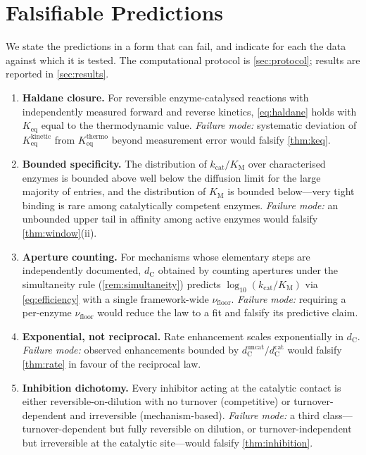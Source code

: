 \documentclass[11pt,twocolumn,a4paper]{article}
\theoremstyle{plain}
\theoremstyle{definition}
\theoremstyle{remark}
\newcommand{\dC}{d_{\mathrm{C}}}
\newcommand{\nufloor}{\nu_{\mathrm{floor}}}
\newcommand{\kcat}{k_{\mathrm{cat}}}
\newcommand{\KM}{K_{\mathrm{M}}}
\newcommand{\Keq}{K_{\mathrm{eq}}}
\begin{document}
\section{Falsifiable Predictions}
\label{sec:predictions}

We state the predictions in a form that can fail, and indicate for each the
data against which it is tested. The computational protocol is
\cref{sec:protocol}; results are reported in \cref{sec:results}.

\begin{enumerate}[label=\textbf{P\arabic*.},leftmargin=3em,itemsep=0.6em]

\item \textbf{Haldane closure.} For reversible enzyme-catalysed reactions with
independently measured forward and reverse kinetics, \cref{eq:haldane} holds
with $\Keq$ equal to the thermodynamic value. \emph{Failure mode:} systematic
deviation of $\Keq^{\text{kinetic}}$ from $\Keq^{\text{thermo}}$ beyond
measurement error would falsify \cref{thm:keq}.

\item \textbf{Bounded specificity.} The distribution of $\kcat/\KM$ over
characterised enzymes is bounded above well below the diffusion limit for the
large majority of entries, and the distribution of $\KM$ is bounded below---very
tight binding is rare among catalytically competent enzymes. \emph{Failure
mode:} an unbounded upper tail in affinity among active enzymes would falsify
\cref{thm:window}(ii).

\item \textbf{Aperture counting.} For mechanisms whose elementary steps are
independently documented, $\dC$ obtained by counting apertures under the
simultaneity rule (\cref{rem:simultaneity}) predicts $\log_{10}(\kcat/\KM)$ via
\cref{eq:efficiency} with a single framework-wide $\nufloor$. \emph{Failure
mode:} requiring a per-enzyme $\nufloor$ would reduce the law to a fit and
falsify its predictive claim.

\item \textbf{Exponential, not reciprocal.} Rate enhancement scales
exponentially in $\dC$. \emph{Failure mode:} observed enhancements bounded by
$\dC^{\text{uncat}}/\dC^{\text{cat}}$ would falsify \cref{thm:rate} in favour of
the reciprocal law.

\item \textbf{Inhibition dichotomy.} Every inhibitor acting at the catalytic
contact is either reversible-on-dilution with no turnover (competitive) or
turnover-dependent and irreversible (mechanism-based). \emph{Failure mode:} a
third class---turnover-dependent but fully reversible on dilution, or
turnover-independent but irreversible at the catalytic site---would falsify
\cref{thm:inhibition}.


\end{enumerate}
\end{document}
